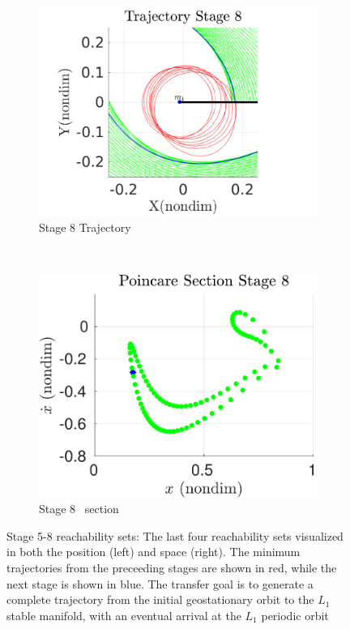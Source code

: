 \documentclass[smallcondensed]{svjour3}
\begin{document}
\begin{figure}[htbp]
    \begin{subfigure}[htbp]{0.5\textwidth} 
        \includegraphics[width=\textwidth, keepaspectratio]{figures/geo_transfer/stage8_trajectory_zoom.pdf} 
        \caption{Stage 8 Trajectory~\label{fig:stage8_trajecotry_zoom}} 
    \end{subfigure}~
    \begin{subfigure}[htbp]{0.5\textwidth} 
        \includegraphics[width=\textwidth, keepaspectratio]{figures/geo_transfer/stage8_poincare.pdf} 
        \caption{Stage 8 \Poincare~section \label{fig:stage8_poincare}} 
    \end{subfigure}   
    \caption{Stage 5-8 reachability sets: The last four reachability sets visualized in both the position (left) and \Poincare space (right).
        The minimum trajectories from the preceeding stages are shown in red, while the next stage is shown in blue.
    The transfer goal is to generate a complete trajectory from the initial geostationary orbit to the \( L_1 \) stable manifold, with an eventual arrival at the \( L_1 \) periodic orbit~\label{fig:stage5to8_reachability}}
\end{figure}
\end{document}
